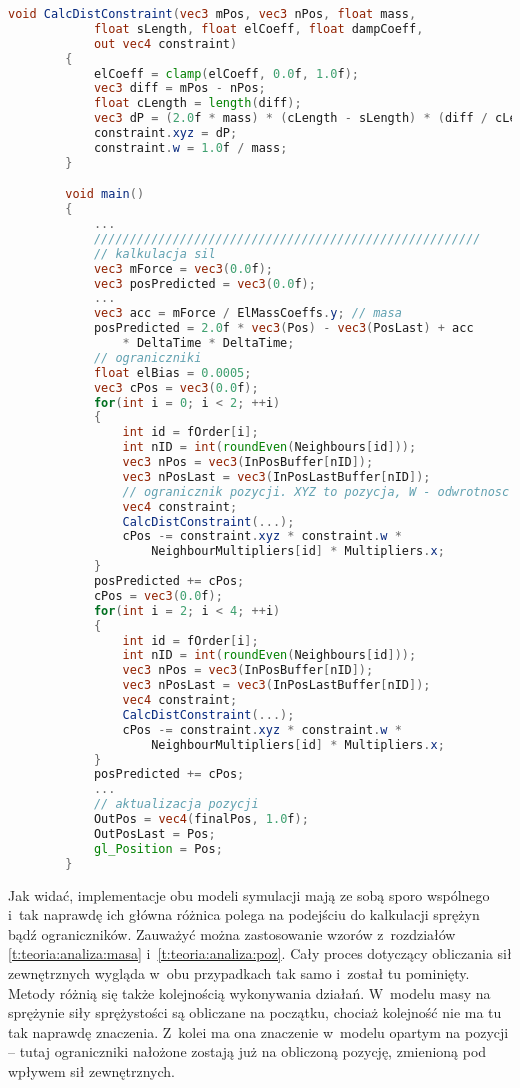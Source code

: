 		\begin{lstlisting}[language=GLSL,caption={Obliczanie przesunięcia -- model oparty na pozycji},label={lst_5_2}]
		void CalcDistConstraint(vec3 mPos, vec3 nPos, float mass, 
			float sLength, float elCoeff, float dampCoeff,
			out vec4 constraint)
		{
			elCoeff = clamp(elCoeff, 0.0f, 1.0f);
			vec3 diff = mPos - nPos;
			float cLength = length(diff);
			vec3 dP = (2.0f * mass) * (cLength - sLength) * (diff / cLength) * elCoeff;
			constraint.xyz = dP;
			constraint.w = 1.0f / mass;
		}

		void main()
		{
			...
			//////////////////////////////////////////////////////
			// kalkulacja sil
			vec3 mForce = vec3(0.0f);
			vec3 posPredicted = vec3(0.0f);
			...
			vec3 acc = mForce / ElMassCoeffs.y;	// masa
			posPredicted = 2.0f * vec3(Pos) - vec3(PosLast) + acc 
				* DeltaTime * DeltaTime;
			// ograniczniki
			float elBias = 0.0005;
			vec3 cPos = vec3(0.0f);
			for(int i = 0; i < 2; ++i)
			{
				int id = fOrder[i];
				int nID = int(roundEven(Neighbours[id]));
				vec3 nPos = vec3(InPosBuffer[nID]);
				vec3 nPosLast = vec3(InPosLastBuffer[nID]);
				// ogranicznik pozycji. XYZ to pozycja, W - odwrotnosc masy
				vec4 constraint;
				CalcDistConstraint(...);
				cPos -= constraint.xyz * constraint.w * 
					NeighbourMultipliers[id] * Multipliers.x;
			}
			posPredicted += cPos;
			cPos = vec3(0.0f);
			for(int i = 2; i < 4; ++i)
			{
				int id = fOrder[i];
				int nID = int(roundEven(Neighbours[id]));
				vec3 nPos = vec3(InPosBuffer[nID]);
				vec3 nPosLast = vec3(InPosLastBuffer[nID]);
				vec4 constraint;
				CalcDistConstraint(...);
				cPos -= constraint.xyz * constraint.w * 
					NeighbourMultipliers[id] * Multipliers.x;
			}
			posPredicted += cPos;
			...
			// aktualizacja pozycji
			OutPos = vec4(finalPos, 1.0f);
			OutPosLast = Pos;
			gl_Position = Pos;
		}	
		\end{lstlisting}
		\newpage
		Jak widać, implementacje obu modeli symulacji mają ze sobą sporo wspólnego i~tak naprawdę ich główna różnica polega na podejściu do kalkulacji sprężyn bądź ograniczników. Zauważyć można zastosowanie wzorów z~rozdziałów \ref{t:teoria:analiza:masa} i~\ref{t:teoria:analiza:poz}. Cały proces dotyczący obliczania sił zewnętrznych wygląda w~obu przypadkach tak samo i~został tu pominięty. Metody różnią się także kolejnością wykonywania działań. W~modelu masy na sprężynie siły sprężystości są obliczane na początku, chociaż kolejność nie ma tu tak naprawdę znaczenia. Z~kolei ma ona znaczenie w~modelu opartym na pozycji -- tutaj ograniczniki nałożone zostają już na obliczoną pozycję, zmienioną pod wpływem sił zewnętrznych.
		
